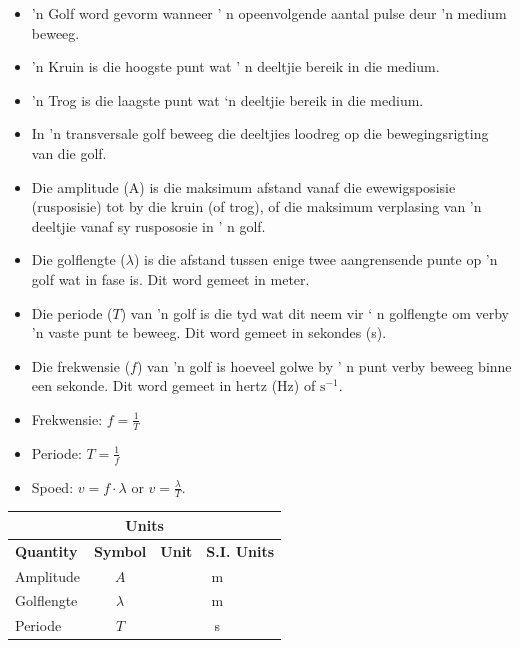 \begin{definition}
            \nopagebreak
      \label{m38806*id324089}\begin{itemize}[noitemsep] 
            \label{m38806*uid108}\item 'n Golf word gevorm wanneer ' n opeenvolgende aantal pulse deur 'n medium beweeg.
\label{m38806*uid109}\item  'n Kruin is die hoogste punt wat  ' n deeltjie bereik in die medium.
\label{m38806*uid110}\item 'n Trog is die laagste punt wat ‘n deeltjie bereik in die medium.
\label{m38806*uid111}\item In 'n transversale golf beweeg die deeltjies loodreg op die bewegingsrigting van die golf.
\label{m38806*uid112}\item Die amplitude (A) is die maksimum afstand vanaf die ewewigsposisie (rusposisie) tot by die kruin 
       (of trog), of die maksimum verplasing van 'n deeltjie vanaf sy ruspososie in ' n golf.
\label{m38806*uid113}\item Die golflengte ($\lambda $) is die afstand tussen enige twee aangrensende punte op 'n golf wat in
         fase is. Dit word gemeet in meter.
\label{m38806*uid114}\item Die periode ($T$) van 'n golf is die tyd wat dit neem vir  ‘ n golflengte om verby  'n vaste punt te beweeg.
       Dit word gemeet in sekondes (s).
\label{m38806*uid115}\item Die frekwensie ($f$) van 'n golf is hoeveel golwe by ' n punt verby beweeg binne een sekonde. Dit word
       gemeet in hertz (Hz) of $\text{s}{}^{-1}$.
\label{m38806*uid116}\item Frekwensie: $f=\frac{1}{T}$\label{m38806*uid117}\item Periode: $T=\frac{1}{f}$\label{m38806*uid118}\item Spoed: $v=f\cdot\lambda $ or $v=\frac{\lambda }{T}$.
\end{itemize}
\begin{table}[H]
\begin{center}
\begin{tabular}{|l|c|c|c|}\hline \hline 
\multicolumn{4}{|c|}{\textbf{Units}}\\ \hline \hline
\textbf{Quantity} & \textbf{Symbol} & \textbf{Unit} & \textbf{S.I. Units}\\ \hline
Amplitude & $A$ & \multicolumn{2}{c|}{m} \\ \hline
Golflengte & $\lambda$ & \multicolumn{2}{c|}{m}  \\ \hline
Periode & $T$ & \multicolumn{2}{c|}{s}  \\ \hline

\end{tabular}
\end{center}
\end{table}
\end{definition}
